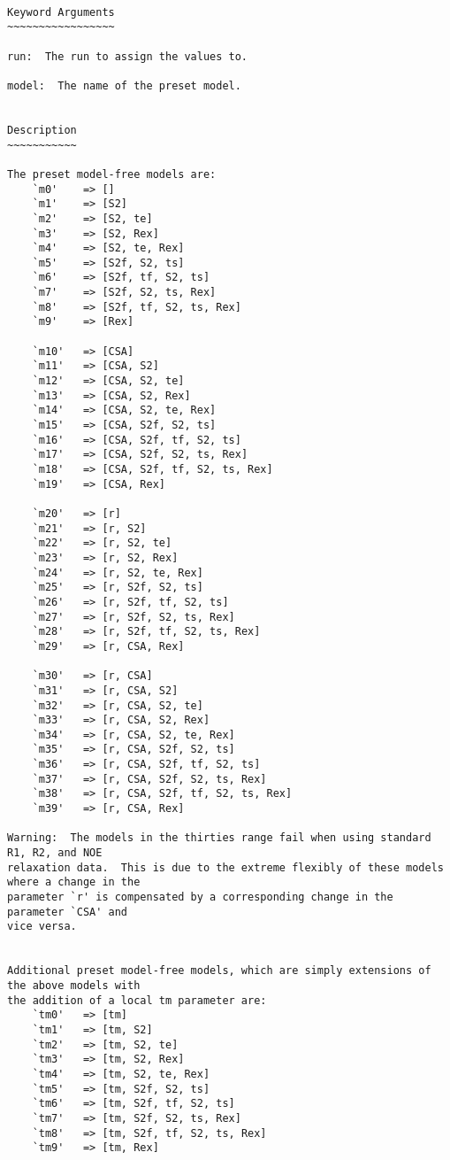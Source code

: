 {\scriptsize
\begin{verbatim}

Keyword Arguments
~~~~~~~~~~~~~~~~~

run:  The run to assign the values to.

model:  The name of the preset model.


Description
~~~~~~~~~~~

The preset model-free models are:
    `m0'    => []
    `m1'    => [S2]
    `m2'    => [S2, te]
    `m3'    => [S2, Rex]
    `m4'    => [S2, te, Rex]
    `m5'    => [S2f, S2, ts]
    `m6'    => [S2f, tf, S2, ts]
    `m7'    => [S2f, S2, ts, Rex]
    `m8'    => [S2f, tf, S2, ts, Rex]
    `m9'    => [Rex]

    `m10'   => [CSA]
    `m11'   => [CSA, S2]
    `m12'   => [CSA, S2, te]
    `m13'   => [CSA, S2, Rex]
    `m14'   => [CSA, S2, te, Rex]
    `m15'   => [CSA, S2f, S2, ts]
    `m16'   => [CSA, S2f, tf, S2, ts]
    `m17'   => [CSA, S2f, S2, ts, Rex]
    `m18'   => [CSA, S2f, tf, S2, ts, Rex]
    `m19'   => [CSA, Rex]

    `m20'   => [r]
    `m21'   => [r, S2]
    `m22'   => [r, S2, te]
    `m23'   => [r, S2, Rex]
    `m24'   => [r, S2, te, Rex]
    `m25'   => [r, S2f, S2, ts]
    `m26'   => [r, S2f, tf, S2, ts]
    `m27'   => [r, S2f, S2, ts, Rex]
    `m28'   => [r, S2f, tf, S2, ts, Rex]
    `m29'   => [r, CSA, Rex]

    `m30'   => [r, CSA]
    `m31'   => [r, CSA, S2]
    `m32'   => [r, CSA, S2, te]
    `m33'   => [r, CSA, S2, Rex]
    `m34'   => [r, CSA, S2, te, Rex]
    `m35'   => [r, CSA, S2f, S2, ts]
    `m36'   => [r, CSA, S2f, tf, S2, ts]
    `m37'   => [r, CSA, S2f, S2, ts, Rex]
    `m38'   => [r, CSA, S2f, tf, S2, ts, Rex]
    `m39'   => [r, CSA, Rex]

Warning:  The models in the thirties range fail when using standard R1, R2, and NOE
relaxation data.  This is due to the extreme flexibly of these models where a change in the
parameter `r' is compensated by a corresponding change in the parameter `CSA' and
vice versa.


Additional preset model-free models, which are simply extensions of the above models with
the addition of a local tm parameter are:
    `tm0'   => [tm]
    `tm1'   => [tm, S2]
    `tm2'   => [tm, S2, te]
    `tm3'   => [tm, S2, Rex]
    `tm4'   => [tm, S2, te, Rex]
    `tm5'   => [tm, S2f, S2, ts]
    `tm6'   => [tm, S2f, tf, S2, ts]
    `tm7'   => [tm, S2f, S2, ts, Rex]
    `tm8'   => [tm, S2f, tf, S2, ts, Rex]
    `tm9'   => [tm, Rex]


\end{verbatim}}
